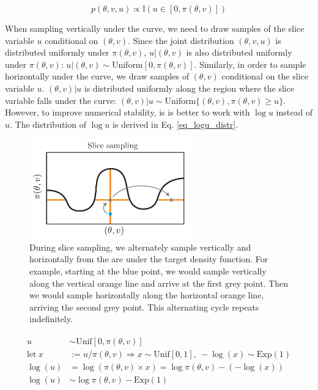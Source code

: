 \documentclass[12pt]{article}
\begin{document}
{\begin{equation}
p(\theta, v, u) \propto \mathbb{I}\left(u \in\left[0, \pi(\theta, v) \right]\right)
\end{equation}

When sampling vertically under the curve, we need to draw samples of the slice variable $u$ conditional on $(\theta, v)$. Since the joint distribution $(\theta, v, u)$ is distributed uniformly under $\pi(\theta, v)$, $u|(\theta, v)$ is also distributed uniformly under $\pi(\theta, v)$: $u|(\theta, v) \sim \text{Uniform}[0, \pi(\theta, v)]$. Similarly, in order to sample horizontally under the curve, we draw samples of $(\theta, v)$ conditional on the slice variable $u$. $(\theta, v)|u$ is distributed uniformly along the region where the slice variable falls under the curve: $(\theta, v) | u \sim \text{Uniform}\{(\theta, v), \pi(\theta, v) \geq u\}$. However, to improve numerical stability, is is better to work with $\log u$ instead of $u$. The distribution of $\log u$ is derived in Eq. \ref{eq_logu_distr}.

\begin{figure}[ht]
\centering
\includegraphics[width=7cm]{illustrations/slice_sampling.pdf}
\caption{During slice sampling, we alternately sample vertically and horizontally from the are under the target density function. For example, starting at the blue point, we would sample vertically along the vertical orange line and arrive at the first grey point. Then we would sample horizontally along the horizontal orange line, arriving the second grey point. This alternating cycle repeats indefinitely.}
\label{fig_slice_sampling}
\end{figure}


\begin{align}
\begin{split}
u &\sim \text{Unif}[0, \pi(\theta, v)] \\
\text{let} \ x &:= u/\pi(\theta, v) \Rightarrow x \sim \text{Unif}[0, 1], \  -\log(x) \sim \text{Exp}(1) \\
\log(u) &= \log(\pi(\theta, v) \times x) = \log\pi(\theta, v) - (-\log(x)) \\
\log(u) &\sim \log \pi(\theta, v) - \text{Exp}(1)
\end{split}
\label{eq_logu_distr}
\end{align}


}
\end{document}

